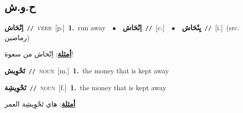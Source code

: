 \documentclass[10pt,a4paper,twoside]{article} %
\begin{document}
\begin{multicols}{2}
\vspace{-3mm}
\subsection*{\color{blue}\foreignlanguage{arabic}{ح.و.ش}\color{blue}{}} 

{\setlength\topsep{0pt}\textbf{\foreignlanguage{arabic}{اِنْحَاش}}\ {\color{gray}\texttt{//}\color{black}}\ \textsc{verb}\ [p.]\ \textbf{1.}~run away\ \ $\bullet$\ \ \setlength\topsep{0pt}\textbf{\foreignlanguage{arabic}{اِنْحَاش}}\ {\color{gray}\texttt{//}\color{black}}\ [c.]\ \ $\bullet$\ \ \setlength\topsep{0pt}\textbf{\foreignlanguage{arabic}{يِنْحَاش}}\ {\color{gray}\texttt{//}\color{black}}\ [i.]\ (src. \color{gray}\foreignlanguage{arabic}{رماضين}\color{black})\  \begin{flushright}\color{gray}\foreignlanguage{arabic}{\textbf{\underline{\foreignlanguage{arabic}{أمثلة}}}: اِنْحاش من سعوة!}\end{flushright}\color{black}} \vspace{2mm}

{\setlength\topsep{0pt}\textbf{\foreignlanguage{arabic}{تَحْوِيش}}\ {\color{gray}\texttt{//}\color{black}}\ \textsc{noun}\ [m.]\ \textbf{1.}~the money that is kept away\ } \vspace{2mm}

{\setlength\topsep{0pt}\textbf{\foreignlanguage{arabic}{تَحْوِيشِة}}\ {\color{gray}\texttt{//}\color{black}}\ \textsc{noun}\ [f.]\ \textbf{1.}~the money that is kept away\  \begin{flushright}\color{gray}\foreignlanguage{arabic}{\textbf{\underline{\foreignlanguage{arabic}{أمثلة}}}: هاي تَحْوِيشِة العمر}\end{flushright}\color{black}} \vspace{2mm}


\end{multicols}
\end{document}
